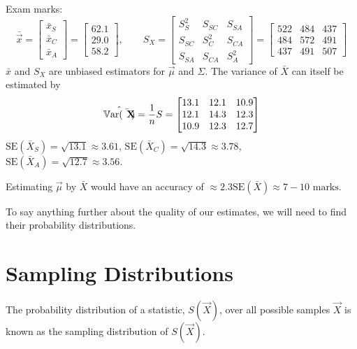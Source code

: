 \documentclass[10pt, a4paper]{article}
\begin{document}
\begin{example}
    Exam marks:
    \[
    \bar{\vec{x}} = \begin{bmatrix}
        \bar{x}_S \\ \bar{x}_C \\ \bar{x}_A
    \end{bmatrix} = \begin{bmatrix}
        62.1 \\ 29.0 \\ 58.2
    \end{bmatrix}, \qquad S_X = \begin{bmatrix}
        S_S ^ 2 & S_{SC} & S_{SA} \\
        S_{SC} & S_{C} ^ 2 & S_{CA} \\
        S_{SA} & S_{CA} & S_{A} ^ 2
    \end{bmatrix} = \begin{bmatrix}
        522 & 484 & 437 \\
        484 & 572 & 491 \\
        437 & 491 & 507
    \end{bmatrix}
    \]
    $\bar{x}$ and $S_X$ are unbiased estimators for $\vec{\mu}$ and $\Sigma$.
    The variance of $\bar{X}$ can itself be estimated by
    \[
    \hat{\mathbb{V}\mathrm{ar}(\bar{\mathbf{X}})} = \frac{1}{n}S = \begin{bmatrix}
        13.1 & 12.1 & 10.9 \\
        12.1 & 14.3 & 12.3 \\
        10.9 & 12.3 & 12.7
    \end{bmatrix}
    \]
    $\mathrm{SE}(\bar{X}_S) = \sqrt{13.1} \approx 3.61$,
    $\mathrm{SE}(\bar{X}_C) = \sqrt{14.3} \approx 3.78$,
    $\mathrm{SE}(\bar{X}_A) = \sqrt{12.7} \approx 3.56$.
    
    Estimating $\vec{\mu}$ by $\bar{X}$ would have an accuracy of $\approx 2.3\mathrm{SE}(\bar{X}) \approx 7-10\text{ marks}$.
\end{example}
To say anything further about the quality of our estimates,
we will need to find their probability distributions.

\newpage

\section{Sampling Distributions}
\begin{definition}
    The probability distribution of a statistic,
    $S(\vec{X})$,
    over all possible samples $\vec{X}$ is known as the sampling distribution of $S(\vec{X})$.
\end{definition}
\end{document}
